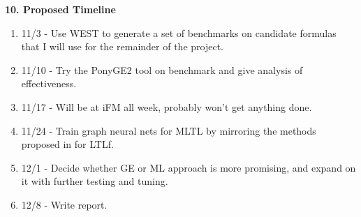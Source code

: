 \documentclass[12pt]{article}
\begin{document}
\noindent \textbf{10. Proposed Timeline}
\begin{enumerate}
    \item 11/3 - Use WEST to generate a set of benchmarks on candidate formulas that I will use for the remainder of the project. 
    \item 11/10 - Try the PonyGE2 tool on benchmark and give analysis of effectiveness. 
    \item 11/17 - Will be at iFM all week, probably won't get anything done.
    \item 11/24 - Train graph neural nets for MLTL by mirroring the methods proposed in \cite{Luo_Liang_Du_Wan_Peng_Zhang_2022} for LTLf.
    \item 12/1 - Decide whether GE or ML approach is more promising, and expand on it with further testing and tuning. 
    \item 12/8 - Write report. 
\end{enumerate}


\newpage
\end{document}
